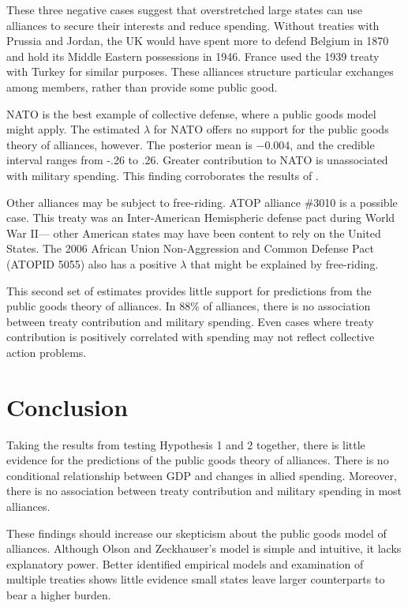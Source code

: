 \documentclass[12pt]{article}
\begin{document}
These three negative cases suggest that overstretched large states can use alliances to secure their interests and reduce spending. 
Without treaties with Prussia and Jordan, the UK would have spent more to defend Belgium in 1870 and hold its Middle Eastern possessions in 1946. 
France used the 1939 treaty with Turkey for similar purposes. 
These alliances structure particular exchanges among members, rather than provide some public good. 


NATO is the best example of collective defense, where a public goods model might apply. 
The estimated $\lambda$ for NATO offers no support for the public goods theory of alliances, however. 
The posterior mean is $-0.004$, and the credible interval ranges from -.26 to .26.  
Greater contribution to NATO is unassociated with military spending. 
This finding corroborates the results of \citet{PluemperNeumayer2015}. 


Other alliances may be subject to free-riding. 
ATOP alliance \#3010 is a possible case. 
This treaty was an Inter-American Hemispheric defense pact during World War II--- other American states may have been content to rely on the United States. 
The 2006 African Union Non-Aggression and Common Defense Pact (ATOPID 5055) also has a positive $\lambda$ that might be explained by free-riding.  


This second set of estimates provides little support for predictions from the public goods theory of alliances. 
In 88\% of alliances, there is no association between treaty contribution and military spending. 
Even cases where treaty contribution is positively correlated with spending may not reflect collective action problems. 


\section{Conclusion}

Taking the results from testing Hypothesis 1 and 2 together, there is little evidence for the predictions of the public goods theory of alliances. 
There is no conditional relationship between GDP and changes in allied spending.
Moreover, there is no association between treaty contribution and military spending in most alliances. 


These findings should increase our skepticism about the public goods model of alliances. 
Although Olson and Zeckhauser's model is simple and intuitive, it lacks explanatory power. 
Better identified empirical models and examination of multiple treaties shows little evidence small states leave larger counterparts to bear a higher burden. 
\end{document}
